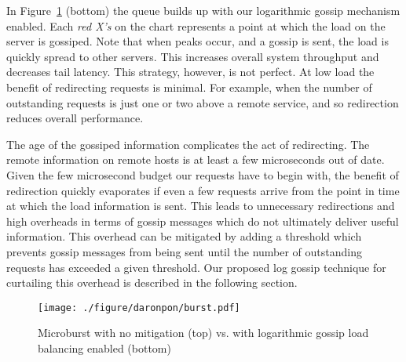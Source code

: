 In Figure~\ref{fig:microburst} (bottom) the queue builds up with our
logarithmic gossip mechanism enabled. Each \textit{red X's} on the chart
represents a point at which the load on the server is gossiped.  Note that when
peaks occur, and a gossip is sent, the load is quickly spread to other servers.
This increases overall system throughput and decreases tail latency. This
strategy, however, is not perfect. At low load the benefit of redirecting
requests is minimal. For example, when the number of outstanding requests is
just one or two above a remote service, and so redirection reduces overall
performance.

The age of the gossiped information complicates the act of redirecting. The
remote information on remote hosts is at least a few microseconds out of date.
Given the few microsecond budget our requests have to begin with, the benefit
of redirection quickly evaporates if even a few requests arrive from the point
in time at which the load information is sent.  This leads to unnecessary
redirections and high overheads in terms of gossip messages which do not
ultimately deliver useful information. This overhead can be mitigated by adding
a threshold which prevents gossip messages from being sent until the number of
outstanding requests has exceeded a given threshold.  Our proposed log gossip
technique for curtailing this overhead is described in the following section.




\begin{figure}[t]
  \centering
    \texttt{[image: ./figure/daronpon/burst.pdf]}
    \centering

    \caption{Microburst with no mitigation (top) vs. with
    logarithmic gossip load balancing enabled (bottom)}

  \label{fig:microburst}
\end{figure}

